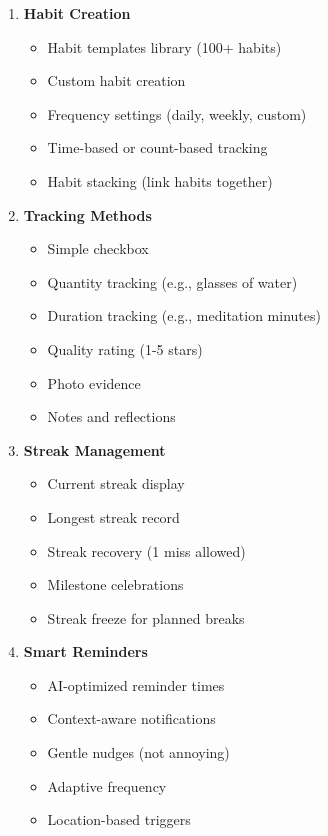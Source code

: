 \begin{enumerate}
    \item \textbf{Habit Creation}
    \begin{itemize}
        \item Habit templates library (100+ habits)
        \item Custom habit creation
        \item Frequency settings (daily, weekly, custom)
        \item Time-based or count-based tracking
        \item Habit stacking (link habits together)
    \end{itemize}
    
    \item \textbf{Tracking Methods}
    \begin{itemize}
        \item Simple checkbox
        \item Quantity tracking (e.g., glasses of water)
        \item Duration tracking (e.g., meditation minutes)
        \item Quality rating (1-5 stars)
        \item Photo evidence
        \item Notes and reflections
    \end{itemize}
    
    \item \textbf{Streak Management}
    \begin{itemize}
        \item Current streak display
        \item Longest streak record
        \item Streak recovery (1 miss allowed)
        \item Milestone celebrations
        \item Streak freeze for planned breaks
    \end{itemize}
    
    \item \textbf{Smart Reminders}
    \begin{itemize}
        \item AI-optimized reminder times
        \item Context-aware notifications
        \item Gentle nudges (not annoying)
        \item Adaptive frequency
        \item Location-based triggers
    \end{itemize}
    

\end{enumerate}
